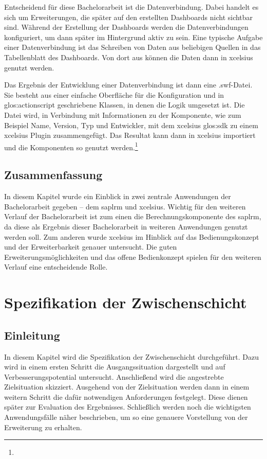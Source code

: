 \begin{onehalfspacing}
Entscheidend für diese Bachelorarbeit ist die Datenverbindung. Dabei handelt es sich um Erweiterungen, die später auf den erstellten Dashboards nicht sichtbar sind. Während der Erstellung der Dashboards werden die Datenverbindungen konfiguriert, um dann später im Hintergrund aktiv zu sein. Eine typische Aufgabe einer Datenverbindung ist das Schreiben von Daten aus beliebigen Quellen in das Tabellenblatt des Dashboards. Von dort aus können die Daten dann in \gls{xcelsius} genutzt werden.

Das Ergebnis der Entwicklung einer Datenverbindung ist dann eine .swf-Datei. Sie besteht aus einer einfache Oberfläche für die Konfiguration und in \gls{glos:actionscript} geschriebene Klassen, in denen die Logik umgesetzt ist. Die Datei wird, in Verbindung mit Informationen zu der Komponente, wie zum Beispiel Name, Version, Typ und Entwickler, mit dem \gls{xcelsius} \gls{glos:sdk} zu einem \gls{xcelsius} Plugin zusammengefügt. Das Resultat kann dann in \gls{xcelsius} importiert und die Komponenten so genutzt werden.\footnote{ }

\section{Zusammenfassung}
In diesem Kapitel wurde ein Einblick in zwei zentrale Anwendungen der Bachelorarbeit gegeben -- dem \gls{saplrm} und \gls{xcelsius}. Wichtig für den weiteren Verlauf der Bachelorarbeit ist zum einen die Berechnungskomponente des \gls{saplrm}, da diese als Ergebnis dieser Bachelorarbeit in weiteren Anwendungen genutzt werden soll. Zum anderen wurde \gls{xcelsius} im Hinblick auf das Bedienungskonzept und der Erweiterbarkeit genauer untersucht. Die guten Erweiterungsmöglichkeiten und das offene Bedienkonzept spielen für den weiteren Verlauf eine entscheidende Rolle.

\chapter{Spezifikation der Zwischenschicht}
\label{sec:spezifikation}

\section{Einleitung}
In diesem Kapitel wird die Spezifikation der Zwischenschicht durchgeführt. Dazu wird in einem ersten Schritt die Ausgangssituation dargestellt und auf Verbesserungspotential untersucht. Anschließend wird die angestrebte Zielsituation skizziert. Ausgehend von der Zielsituation werden dann in einem weitern Schritt die dafür notwendigen Anforderungen festgelegt. Diese dienen später zur Evaluation des Ergebnisses. Schließlich werden noch die wichtigsten Anwendungsfälle näher beschrieben, um so eine genauere Vorstellung von der Erweiterung zu erhalten.


\end{onehalfspacing}
